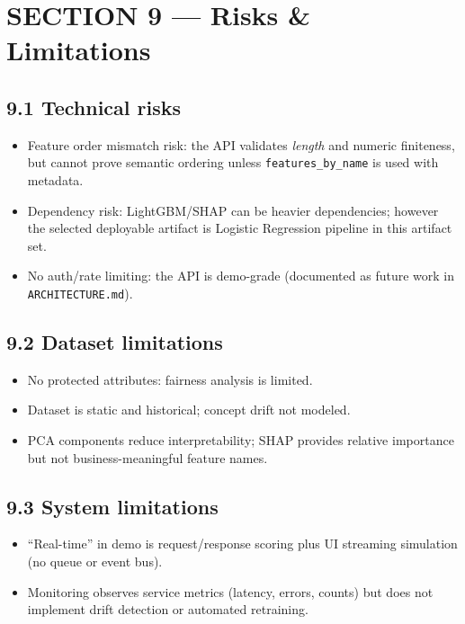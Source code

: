 \documentclass[11pt]{article}
\newcommand{\code}[1]{\texttt{#1}}
\begin{document}
\section*{SECTION 9 — Risks \& Limitations}

\subsection*{9.1 Technical risks}
\begin{itemize}
  \item Feature order mismatch risk: the API validates \emph{length} and numeric finiteness, but cannot prove semantic ordering unless \code{features\_by\_name} is used with metadata.
  \item Dependency risk: LightGBM/SHAP can be heavier dependencies; however the selected deployable artifact is Logistic Regression pipeline in this artifact set.
  \item No auth/rate limiting: the API is demo-grade (documented as future work in \code{ARCHITECTURE.md}).
\end{itemize}

\subsection*{9.2 Dataset limitations}
\begin{itemize}
  \item No protected attributes: fairness analysis is limited.
  \item Dataset is static and historical; concept drift not modeled.
  \item PCA components reduce interpretability; SHAP provides relative importance but not business-meaningful feature names.
\end{itemize}

\subsection*{9.3 System limitations}
\begin{itemize}
  \item ``Real-time'' in demo is request/response scoring plus UI streaming simulation (no queue or event bus).
  \item Monitoring observes service metrics (latency, errors, counts) but does not implement drift detection or automated retraining.
\end{itemize}
\end{document}
